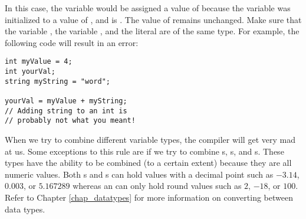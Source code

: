 In this case, the variable  would be assigned a value of  because the variable  was initialized to a value of , and  is .
The value of  remains unchanged. 
Make sure that the variable , the variable , and the literal  are of the same type. 
For example, the following code will result in an error:

\noindent\begin{minipage}{\linewidth}\begin{lstlisting}
int myValue = 4;
int yourVal;
string myString = "word";
		
yourVal = myValue + myString; 
// Adding string to an int is
// probably not what you meant!
\end{lstlisting}\end{minipage}

When we try to combine different variable types, the compiler will get very mad at us. 
Some exceptions to this rule are if we try to combine s, s, and s.
These types have the ability to be combined (to a certain extent) because they are all numeric values.
Both s and s can hold values with a decimal point such as $-3.14$, $0.003$, or $5.167289$ whereas an  can only hold round values such as $2$, $-18$, or $100$. 
Refer to Chapter \ref{chap_datatypes} for more information on converting between data types.


